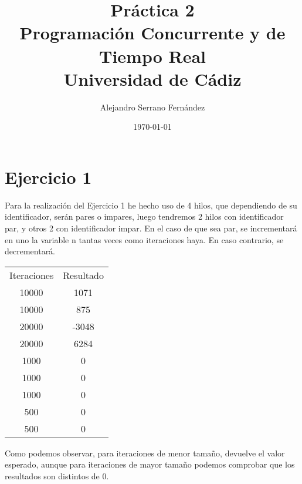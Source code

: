 \documentclass{article}
\title{Práctica 2 \\ Programación Concurrente y de Tiempo Real \\Universidad de Cádiz} %
\author{Alejandro Serrano Fernández} %
\date{\today} %
\begin{document}
\maketitle %



\section{Ejercicio 1}
Para la realización del Ejercicio 1 he hecho uso de 4 hilos, que dependiendo de su identificador, serán pares o impares, luego tendremos 2 hilos con identificador par, y otros 2 con identificador impar. En el caso de que sea par, se incrementará en uno la variable n tantas veces como iteraciones haya. En caso contrario, se decrementará.
 \\
\begin{center}
 \begin{tabular}{|c| c|}
 	Iteraciones & Resultado \\
 	10000 & 1071	\\
 	10000 & 875	\\
 	20000 & -3048 	\\
 	20000 & 6284 	\\
 	1000 & 0	\\
 	1000 & 0 \\
 	1000 & 0 \\
 	500 & 0 \\
 	500 & 0 
 \end{tabular}
 
\end{center}
\hfill \break
Como podemos observar, para iteraciones de menor tamaño, devuelve el valor esperado, aunque para iteraciones de mayor tamaño podemos comprobar que los resultados son distintos de 0. 

\end{document}
